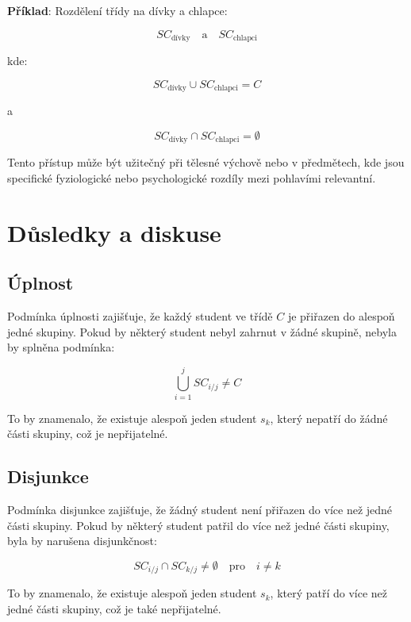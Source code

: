 \begin{samepage}
\setlength{\parindent}{0em}
\setlength{\parskip}{1em}

\textbf{Příklad}: Rozdělení třídy na dívky a chlapce:
\nopagebreak

\[
SC_{\text{dívky}} \quad \text{a} \quad SC_{\text{chlapci}}
\]
\nopagebreak

kde:
\nopagebreak

\[
SC_{\text{dívky}} \cup SC_{\text{chlapci}} = C
\]
\nopagebreak

a
\nopagebreak

\[
SC_{\text{dívky}} \cap SC_{\text{chlapci}} = \emptyset
\]

Tento přístup může být užitečný při tělesné výchově nebo v předmětech, kde jsou specifické fyziologické nebo psychologické rozdíly mezi pohlavími relevantní.
\end{samepage}

\section{Důsledky a diskuse}

\subsection*{Úplnost}

Podmínka úplnosti zajišťuje, že každý student ve třídě \( C \) je přiřazen do alespoň jedné skupiny. Pokud by některý student nebyl zahrnut v žádné skupině, nebyla by splněna podmínka:

\[
\bigcup_{i=1}^{j} SC_{i/j} \neq C
\]

To by znamenalo, že existuje alespoň jeden student \( s_k \), který nepatří do žádné části skupiny, což je nepřijatelné.
\pagebreak
\begin{samepage}
\subsection*{Disjunkce}

Podmínka disjunkce zajišťuje, že žádný student není přiřazen do více než jedné části skupiny. Pokud by některý student patřil do více než jedné části skupiny, byla by narušena disjunkčnost:
\nopagebreak

\[
SC_{i/j} \cap SC_{k/j} \neq \emptyset \quad \text{pro} \quad i \neq k
\]
\nopagebreak

To by znamenalo, že existuje alespoň jeden student \( s_k \), který patří do více než jedné části skupiny, což je také nepřijatelné.
\end{samepage}

